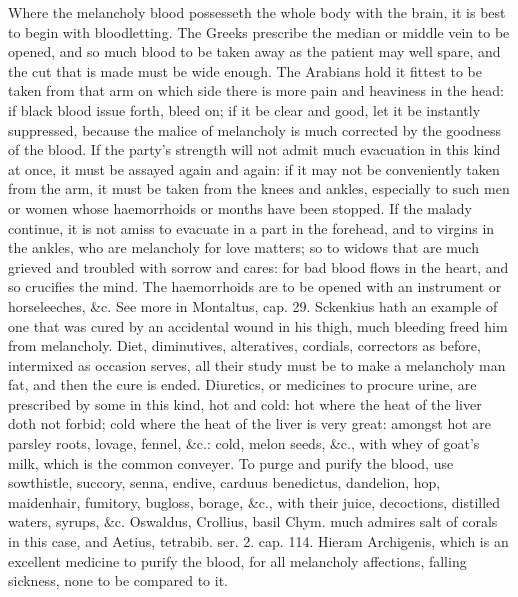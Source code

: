 Where the melancholy blood possesseth the whole body with the brain,
 it is best to begin with bloodletting. The Greeks prescribe the
 median or middle vein to be opened, and so much blood to be
taken away as the patient may well spare, and the cut that is made must
be wide enough. The Arabians hold it fittest to be taken from that arm
on which side there is more pain and heaviness in the head: if black
blood issue forth, bleed on; if it be clear and good, let it be
instantly suppressed,  because the malice of melancholy is much
corrected by the goodness of the blood. If the party's strength will
not admit much evacuation in this kind at once, it must be assayed
again and again: if it may not be conveniently taken from the arm, it
must be taken from the knees and ankles, especially to such men or
women whose haemorrhoids or months have been stopped.  If the
malady continue, it is not amiss to evacuate in a part in the forehead,
and to virgins in the ankles, who are melancholy for love matters; so
to widows that are much grieved and troubled with sorrow and cares: for
bad blood flows in the heart, and so crucifies the mind. The
haemorrhoids are to be opened with an instrument or horseleeches, \&c.
See more in Montaltus, cap. 29. Sckenkius hath an example of one
that was cured by an accidental wound in his thigh, much bleeding freed
him from melancholy. Diet, diminutives, alteratives, cordials,
correctors as before, intermixed as occasion serves, all their
study must be to make a melancholy man fat, and then the cure is ended.
Diuretics, or medicines to procure urine, are prescribed by some in
this kind, hot and cold: hot where the heat of the liver doth not
forbid; cold where the heat of the liver is very great: amongst
hot are parsley roots, lovage, fennel, \&c.: cold, melon seeds, \&c.,
with whey of goat's milk, which is the common conveyer.
To purge and purify the blood, use sowthistle, succory, senna,
endive, carduus benedictus, dandelion, hop, maidenhair, fumitory,
bugloss, borage, \&c., with their juice, decoctions, distilled waters,
syrups, \&c.
Oswaldus, Crollius, basil Chym. much admires salt of corals in this
case, and Aetius, tetrabib. ser. 2. cap. 114. Hieram Archigenis, which
is an excellent medicine to purify the blood, for all melancholy
affections, falling sickness, none to be compared to it.


